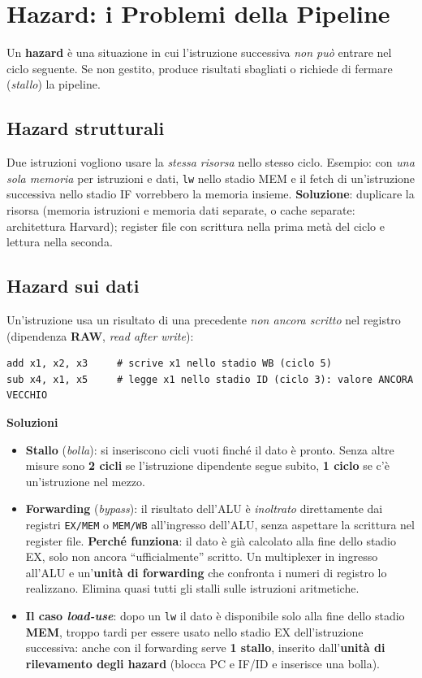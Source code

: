 \section{Hazard: i Problemi della Pipeline}
Un \textbf{hazard} è una situazione in cui l'istruzione successiva \emph{non può} entrare nel ciclo seguente. Se non gestito, produce risultati sbagliati o richiede di fermare (\emph{stallo}) la pipeline.

\subsection{Hazard strutturali}
Due istruzioni vogliono usare la \emph{stessa risorsa} nello stesso ciclo. Esempio: con \emph{una sola memoria} per istruzioni e dati, \texttt{lw} nello stadio MEM e il fetch di un'istruzione successiva nello stadio IF vorrebbero la memoria insieme. \textbf{Soluzione}: duplicare la risorsa (memoria istruzioni e memoria dati separate, o cache separate: architettura Harvard); register file con scrittura nella prima metà del ciclo e lettura nella seconda.

\subsection{Hazard sui dati}
Un'istruzione usa un risultato di una precedente \emph{non ancora scritto} nel registro (dipendenza \textbf{RAW}, \emph{read after write}):
\begin{lstlisting}[numbers=none, caption={Dipendenza RAW}]
add x1, x2, x3     # scrive x1 nello stadio WB (ciclo 5)
sub x4, x1, x5     # legge x1 nello stadio ID (ciclo 3): valore ANCORA VECCHIO
\end{lstlisting}
\textbf{Soluzioni}
\begin{itemize}
    \item \textbf{Stallo} (\emph{bolla}): si inseriscono cicli vuoti finché il dato è pronto. Senza altre misure sono \textbf{2 cicli} se l'istruzione dipendente segue subito, \textbf{1 ciclo} se c'è un'istruzione nel mezzo.
    \item \textbf{Forwarding} (\emph{bypass}): il risultato dell'ALU è \emph{inoltrato} direttamente dai registri \texttt{EX/MEM} o \texttt{MEM/WB} all'ingresso dell'ALU, senza aspettare la scrittura nel register file. \textbf{Perché funziona}: il dato è già calcolato alla fine dello stadio EX, solo non ancora ``ufficialmente'' scritto. Un multiplexer in ingresso all'ALU e un'\textbf{unità di forwarding} che confronta i numeri di registro lo realizzano. Elimina quasi tutti gli stalli sulle istruzioni aritmetiche.
    \item \textbf{Il caso \emph{load-use}}: dopo un \texttt{lw} il dato è disponibile solo alla fine dello stadio \textbf{MEM}, troppo tardi per essere usato nello stadio EX dell'istruzione successiva: anche con il forwarding serve \textbf{1 stallo}, inserito dall'\textbf{unità di rilevamento degli hazard} (blocca PC e IF/ID e inserisce una bolla).
\end{itemize}

